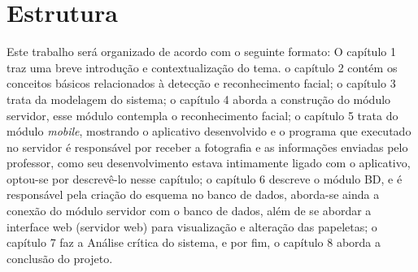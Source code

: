\section{Estrutura}
Este trabalho será organizado de acordo com o seguinte formato: O capítulo 1 traz uma breve introdução e contextualização do tema. o capítulo 2 contém os conceitos básicos relacionados à detecção e reconhecimento facial; o capítulo 3 trata da modelagem do sistema; o capítulo 4 aborda a construção do módulo servidor, esse módulo contempla o reconhecimento facial; o capítulo 5 trata do módulo \textit{mobile}, mostrando o aplicativo desenvolvido e o programa que executado no servidor é responsável por receber a fotografia e as informações enviadas pelo professor, como seu desenvolvimento estava intimamente ligado com o aplicativo, optou-se por descrevê-lo nesse capítulo; o capítulo 6 descreve o módulo BD, e é responsável pela criação do esquema no banco de dados, aborda-se ainda a conexão do módulo servidor com o banco de dados, além de se abordar a interface web (servidor web)  para visualização e alteração das papeletas; o capítulo 7 faz a Análise crítica do sistema, e por fim, o capítulo 8 aborda a  conclusão do projeto.





